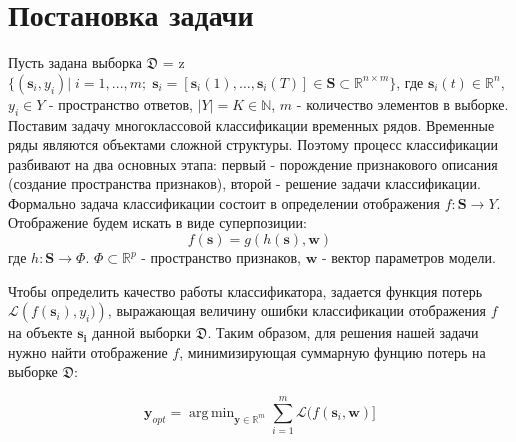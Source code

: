 \documentclass[12pt,twoside]{article}
\DeclareMathOperator*{\argmin}{arg\,min}
\begin{document}
\section{Постановка задачи}
Пусть задана выборка 
$\mathfrak{D}$ = z$\{(\mathbf{s}_i,y_i)|\; i=1,...,m;\; \mathbf{s}_i = [\mathbf{s}_i(1), \dots ,\mathbf{s}_i(T) ] \in \mathbf{S} \subset \mathbb{R}^{n\times m} \}$, где $\mathbf{s}_i(t) \in \mathbb{R}^n$, $ y_i \in Y$ - пространство ответов, $|Y| = K \in \mathbb{N}$, $m$ - количество элементов в выборке. Поставим задачу многоклассовой классификации временных рядов. Временные ряды  являются объектами сложной структуры. Поэтому процесс классификации разбивают на два основных этапа: первый - порождение признакового описания (создание пространства признаков), второй - решение задачи классификации. Формально задача классификации состоит в определении отображения $f: \mathbf{S} \rightarrow Y$. Отображение будем искать в виде суперпозиции: 
\begin{equation}
    f(\mathbf{s}) = g(h(\mathbf{s}), \mathbf{w})
\end{equation}
где $h: \mathbf{S} \rightarrow \Phi$. $\Phi \subset \mathbb{R}^p$ - пространство признаков, $\mathbf{w}$ - вектор параметров модели.

Чтобы определить качество работы классификатора, задается функция потерь $\mathcal{L}\left(f(\mathbf{s}_i), y_i)\right)$, выражающая величину ошибки классификации отображения $f$ на объекте $\mathbf{s_i}$ данной выборки $\mathfrak{D}$. Таким образом, для решения нашей задачи нужно найти отображение $f$, минимизирующая суммарную фунцию потерь на выборке $\mathfrak{D}$:

\begin{equation}
\mathbf{y}_{opt} = \argmin_{\mathbf{y} \in \mathbb{R}^m} \sum^m_{i  = 1}\mathcal{L}(f(\mathbf{s}_i, \mathbf{w})]
\end{equation}
\end{document}
